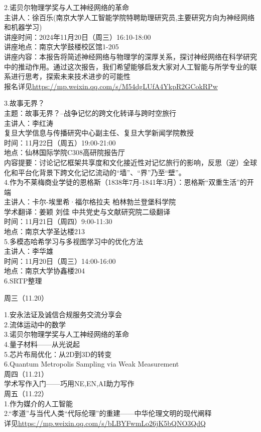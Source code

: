 \documentclass[letterpaper, 12pt]{article}
\begin{document}
\begin{multicols}{2}
2.诺贝尔物理学奖与人工神经网络的革命\\
主讲人：徐百乐(南京大学人工智能学院特聘助理研究员,主要研究方向为神经网络和机器学习)\\
讲座时间：2024年11月20日（周三）16:10-18:00\\
讲座地点：南京大学鼓楼校区馆1-205\\
讲座内容：本报告将简述神经网络与物理学的深厚关系，探讨神经网络在科学研究中的推动作用。通过这次报告，我们希望能够启发大家对人工智能与所学专业的联系进行思考，探索未来技术进步的可能性\\
报名详见\url{https://mp.weixin.qq.com/s/M54dgLUfA4YkpR2GCokRPw}

3.故事无界？\\
主题：故事无界？--战争记忆的跨文化转译与跨时空旅行\\
主讲人：李红涛\\
复旦大学信息与传播研究中心副主任、复旦大学新闻学院教授\\
时间：11月22日（周五）19:00-21:00\\
地点：仙林国际学院C308高研院报告厅\\
内容提要：讨论记忆框架共享度和文化接近性对记忆旅行的影响，反思（逆）全球化和平台化背景下跨文化记忆流动的“墙”、“界”乃至“壁”。\\
4.作为不莱梅商业学徒的恩格斯（1838年7月-1841年3月）：恩格斯“双重生活”的开端\\
主讲人：卡尔-埃里希·福尔格拉夫 柏林勃兰登堡科学院\\
学术翻译：姜颖 刘佳 中共党史与文献研究院二级翻译\\
时间：11月21日（周四）9:00-11:30\\
地点：南京大学圣达楼213\\
5.多模态哈希学习与多视图学习中的优化方法\\
主讲人：李华雄\\
时间：11月20日（周三）14:00-16:00\\
地点：南京大学协鑫楼204\\

6.SRTP整理

周三（11.20）

1.安永法证及诚信合规服务交流分享会\\
2.流体运动中的数学\\
3.诺贝尔物理学奖与人工神经网络的革命\\
4.量子材料——从光说起\\
5.芯片布局优化：从2D到3D的转变\\
6.Quantum Metropolis Sampling via Weak Measurement\\
周四（11.21）\\
学术写作入门——巧用NE,EN,AI助力写作\\
周五（11.22）\\
1.作为媒介的人工智能\\
2.“孝道”与当代人类“代际伦理”的重建——中华伦理文明的现代阐释\\
详见\url{https://mp.weixin.qq.com/s/bLBYFwmLo26jK5bQNO3QdQ}


\end{multicols}
\end{document}
